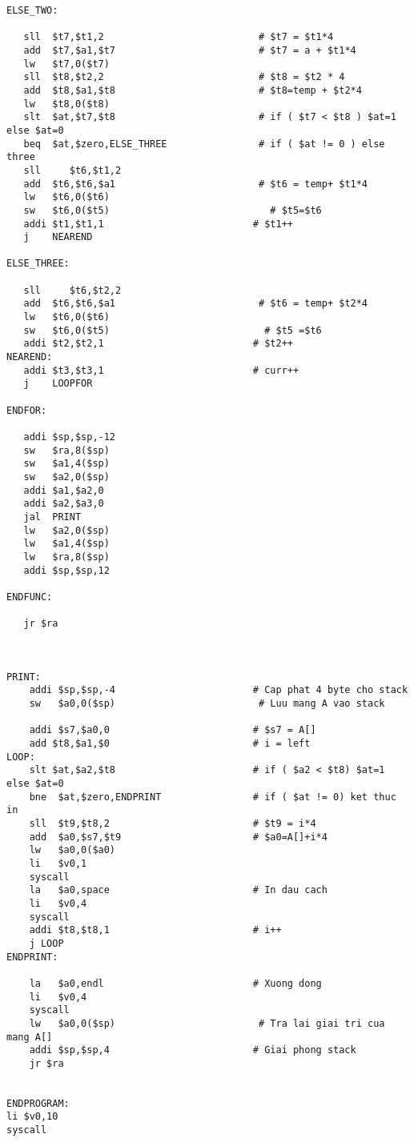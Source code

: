 \documentclass[a4paper]{article}
\begin{document}
\begin{verbatim}
ELSE_TWO:

   sll	$t7,$t1,2                           # $t7 = $t1*4
   add	$t7,$a1,$t7                         # $t7 = a + $t1*4
   lw	$t7,0($t7)			
   sll	$t8,$t2,2                           # $t8 = $t2 * 4
   add	$t8,$a1,$t8	                        # $t8=temp + $t2*4
   lw	$t8,0($t8)
   slt	$at,$t7,$t8	                        # if ( $t7 < $t8 ) $at=1 else $at=0
   beq	$at,$zero,ELSE_THREE                # if ( $at != 0 ) else three
   sll     $t6,$t1,2			
   add	$t6,$t6,$a1	                        # $t6 = temp+ $t1*4
   lw	$t6,0($t6)
   sw	$t6,0($t5)	                          # $t5=$t6
   addi	$t1,$t1,1                          # $t1++
   j	NEAREND

ELSE_THREE:

   sll     $t6,$t2,2
   add	$t6,$t6,$a1	                        # $t6 = temp+ $t2*4
   lw	$t6,0($t6)
   sw	$t6,0($t5)                           # $t5 =$t6
   addi	$t2,$t2,1                          # $t2++
NEAREND:
   addi	$t3,$t3,1                          # curr++
   j	LOOPFOR

ENDFOR:

   addi	$sp,$sp,-12
   sw	$ra,8($sp)
   sw	$a1,4($sp)
   sw	$a2,0($sp)
   addi	$a1,$a2,0
   addi	$a2,$a3,0
   jal 	PRINT
   lw	$a2,0($sp)
   lw	$a1,4($sp)
   lw	$ra,8($sp)
   addi	$sp,$sp,12

ENDFUNC:

   jr $ra



PRINT:
    addi $sp,$sp,-4                        # Cap phat 4 byte cho stack
    sw	 $a0,0($sp)                         # Luu mang A vao stack
    	
    addi $s7,$a0,0                         # $s7 = A[]
    add $t8,$a1,$0                         # i = left
LOOP: 
    slt $at,$a2,$t8                        # if ( $a2 < $t8) $at=1 else $at=0
    bne  $at,$zero,ENDPRINT                # if ( $at != 0) ket thuc in
    sll  $t9,$t8,2                         # $t9 = i*4
    add  $a0,$s7,$t9                       # $a0=A[]+i*4
    lw   $a0,0($a0)   
    li   $v0,1		   
    syscall
    la   $a0,space                         # In dau cach
    li   $v0,4
    syscall
    addi $t8,$t8,1                         # i++
    j LOOP	
ENDPRINT:

    la   $a0,endl                          # Xuong dong
    li   $v0,4			
    syscall 
    lw	 $a0,0($sp)                         # Tra lai giai tri cua mang A[]
    addi $sp,$sp,4                         # Giai phong stack
    jr $ra  
    
    
ENDPROGRAM:
li $v0,10
syscall  
\end{verbatim}
\newpage
\end{document}
